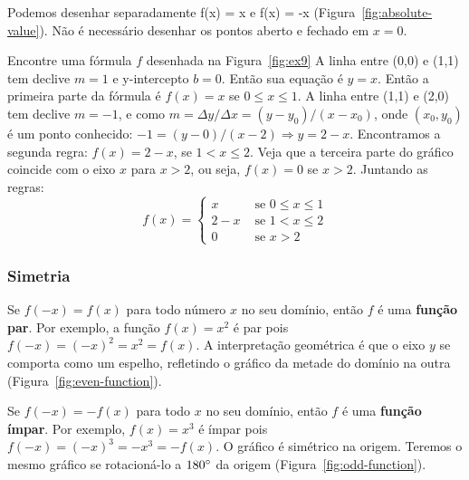 \noindent Podemos desenhar separadamente f(x) = x e f(x) = -x (Figura~\ref{fig:absolute-value}). Não é necessário desenhar os pontos aberto e fechado em $x=0$.
\vspace{-0.7cm}

\exampleEnd
{} Encontre uma fórmula $f$ desenhada na Figura~\ref{fig:ex9}
\solution A linha entre (0,0) e (1,1) tem declive $m = 1$ e y-intercepto $b=0$. Então sua equação é $y=x$. Então a primeira parte da fórmula é $f(x) = x$ se $0\leq x \leq 1$. A linha entre (1,1) e (2,0) tem declive $m=-1$, e como $m=\Delta y/\Delta x=(y-y_0)/(x-x_0)$, onde $(x_0,y_0)$ é um ponto conhecido: $-1 = (y-0)/(x-2) \Rightarrow y=2-x$. Encontramos a segunda regra: $f(x) = 2-x$, se $1<x\leq 2$. Veja que a terceira parte do gráfico coincide com o eixo $x$ para $x>2$, ou seja, $f(x)=0$ se $x>2$. Juntando as regras: $$f(x)=\begin{cases}
x & \text{ se } 0 \leq x \leq 1\\
2-x & \text{ se } 1 < x \leq 2\\
0 & \text{ se } x > 2
\end{cases}$$

\vspace{-0.2cm}
\exampleEnd
\vspace{-1cm}
\subsubsection{Simetria}
\vspace{-0.2cm}
Se $f(-x)=f(x)$ para todo número $x$ no seu domínio, então $f$ é uma \textbf{função par}. Por exemplo, a função $f(x)=x^2$ é par pois $f(-x)=(-x)^2 = x^2 = f(x)$. A interpretação geométrica é que o eixo $y$ se comporta como um espelho, refletindo o gráfico da metade do domínio na outra (Figura~\ref{fig:even-function}).

Se $f(-x)=-f(x)$ para todo $x$ no seu domínio, então $f$ é uma \textbf{função ímpar}. Por exemplo, $f(x) = x^3$ é ímpar pois $f(-x) = (-x)^3 = -x^3 = -f(x)$. O gráfico é simétrico na origem. Teremos o mesmo gráfico se rotacioná-lo a $180\degree$ da origem (Figura~\ref{fig:odd-function}).
\begin{figure}[!ht]
  \centering
  \caption{}
  \vspace{-0.5cm}
\end{figure}

